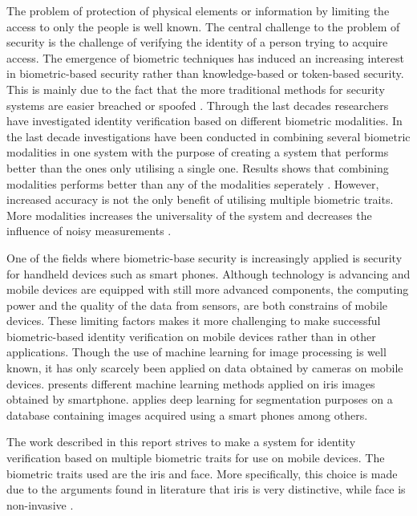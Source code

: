 The problem of protection of physical elements or information by limiting the access to only the people  is well known. The central challenge to the problem of security is the challenge of verifying the identity of a person trying to acquire access. The emergence of biometric techniques has induced an increasing interest in biometric-based security rather than knowledge-based or token-based security. This is mainly due to the fact  that the more traditional methods for security systems are easier breached or spoofed \citep{Ross2003}. Through the last decades researchers have investigated identity verification based on different biometric modalities. In the last decade investigations have been conducted in combining several biometric modalities in one system with the purpose of creating a system that performs better than the ones only utilising a single one. Results shows that combining modalities performs better than any of the modalities seperately \citep{Chen2005a}.  However, increased accuracy is not the only benefit of utilising multiple biometric traits. More modalities increases the universality of the system and decreases the influence of noisy measurements \citep{Ross2003}.

One of the fields where biometric-base security is increasingly applied is security for handheld devices such as smart phones. Although technology is advancing and mobile devices are equipped with still more advanced components, the computing power and the quality of the data from sensors, are both constrains of mobile devices. These limiting factors makes it more challenging to make successful biometric-based identity verification on mobile devices rather than in other applications.  Though the use of machine learning for image processing is well known, it has only scarcely been applied on data obtained by cameras on mobile devices. \cite{Khan2017a} presents different machine learning methods applied on iris images obtained by smartphone. \cite{Bazrafkan2017} applies deep learning for segmentation purposes on a database containing images acquired using a smart phones among others. 
 
The work described in this report strives to make a system for identity verification based on multiple biometric traits for use on mobile devices. The biometric traits used are the iris and face. More specifically, this choice is made due to the arguments found in literature that iris is very distinctive, while face is non-invasive \citep{Wang2009a}. 